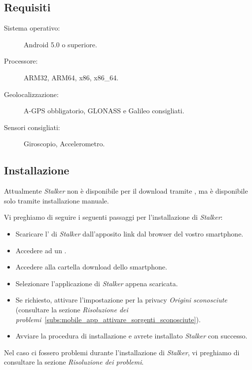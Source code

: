 \documentclass[../manuale-utente.tex]{subfiles}
\begin{document}
\subsection{Requisiti}%
\label{sub:mobile_app_requisiti}

\begin{description}
    \item[Sistema operativo:] Android 5.0 o superiore.
    \item[Processore:] ARM32, ARM64, x86, x86\_64.
    \item[Geolocalizzazione:] A-GPS obbligatorio, GLONASS e Galileo consigliati.
    \item[Sensori consigliati:] Giroscopio, Accelerometro.
\end{description}

\subsection{Installazione}

Attualmente \textit{Stalker} non è disponibile per il download tramite \textit{}, ma è disponibile solo tramite installazione manuale.

Vi preghiamo di seguire i seguenti passaggi per l'installazione di \textit{Stalker}:
\begin{itemize}
    \item Scaricare l'\textit{} di \textit{Stalker} dall'apposito link dal browser del vostro smartphone.
    \item Accedere ad un .
    \item Accedere alla cartella download dello smartphone.
    \item Selezionare l'applicazione di \textit{Stalker} appena scaricata.
    \item Se richiesto, attivare l'impostazione per la privacy \textit{Origini sconosciute} (consultare la sezione \textit{Risoluzione dei problemi}~\ref{subs:mobile_app_attivare_sorgenti_sconosciute}).
    \item Avviare la procedura di installazione e avrete installato \textit{Stalker} con successo.
\end{itemize}

Nel caso ci fossero problemi durante l'installazione di \textit{Stalker}, vi preghiamo di consultare la sezione \textit{Risoluzione dei problemi}.
\end{document}
